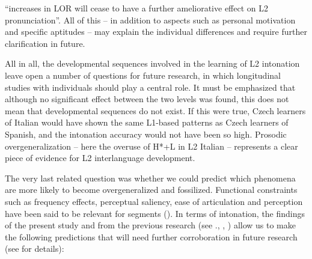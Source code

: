 “increases in LOR will cease to have a further ameliorative effect on L2 pronunciation”. All of this -- in addition to aspects such as personal motivation and specific aptitudes -- may explain the individual differences and require further clarification in future.



All in all, the developmental sequences involved in the learning of L2 intonation leave open a number of questions for future research, in which longitudinal studies with individuals should play a central role. It must be emphasized that although no significant effect between the two levels was found, this does not mean that developmental sequences do not exist. If this were true, Czech learners of Italian would have shown the same L1-based patterns as Czech learners of Spanish, and the intonation accuracy would not have been so high. Prosodic overgeneralization -- here the overuse of H*+L in L2 Italian -- represents a clear piece of evidence for L2 interlanguage development.



The very last related question was whether we could predict which phenomena are more likely to become overgeneralized and fossilized. Functional constraints such as frequency effects, perceptual saliency, ease of articulation and perception have been said to be relevant for segments (\citealt[16]{ColantoniEtAl2015}). In terms of intonation, the findings of the present study and from the previous research (see ., , ) allow us to make the following predictions that will need further corroboration in future research (see  for details):

